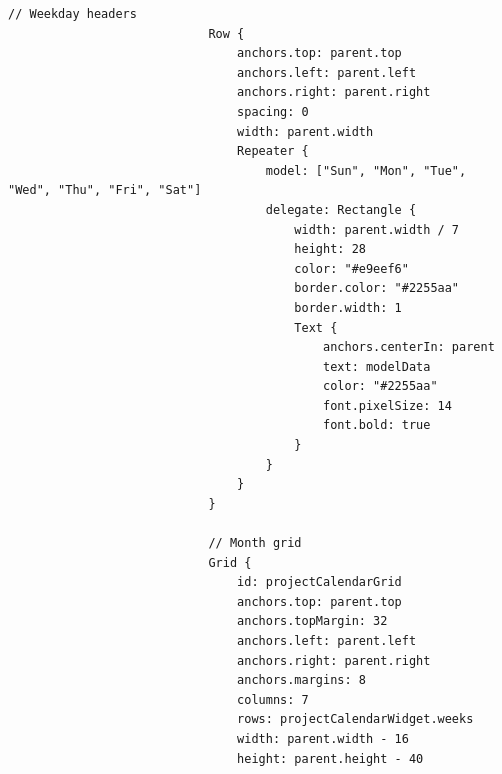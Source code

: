 \documentclass{report}
\begin{document}
\begin{lstlisting}[style=qmlstyle]
                            // Weekday headers
                            Row {
                                anchors.top: parent.top
                                anchors.left: parent.left
                                anchors.right: parent.right
                                spacing: 0
                                width: parent.width
                                Repeater {
                                    model: ["Sun", "Mon", "Tue", "Wed", "Thu", "Fri", "Sat"]
                                    delegate: Rectangle {
                                        width: parent.width / 7
                                        height: 28
                                        color: "#e9eef6"
                                        border.color: "#2255aa"
                                        border.width: 1
                                        Text {
                                            anchors.centerIn: parent
                                            text: modelData
                                            color: "#2255aa"
                                            font.pixelSize: 14
                                            font.bold: true
                                        }
                                    }
                                }
                            }

                            // Month grid
                            Grid {
                                id: projectCalendarGrid
                                anchors.top: parent.top
                                anchors.topMargin: 32
                                anchors.left: parent.left
                                anchors.right: parent.right
                                anchors.margins: 8
                                columns: 7
                                rows: projectCalendarWidget.weeks
                                width: parent.width - 16
                                height: parent.height - 40
                            

\end{lstlisting}
\end{document}
